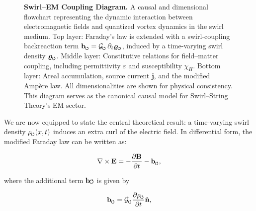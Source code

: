 \documentclass[12pt]{article}
\DeclareRobustCommand{\swirlarrow}{
\mathchoice{\mkern-2mu\scriptstyle\boldsymbol{\circlearrowleft}}%
{\mkern-2mu\scriptstyle\boldsymbol{\circlearrowleft}}%
{\mkern-2mu\scriptscriptstyle\boldsymbol{\circlearrowleft}}%
{\mkern-2mu\scriptscriptstyle\boldsymbol{\circlearrowleft}}
}%
\begin{document}
\begin{figure}[htbp]
{
        }
        \caption{\textbf{Swirl–EM Coupling Diagram.}
        A causal and dimensional flowchart representing the dynamic interaction between electromagnetic fields and quantized vortex dynamics in the swirl medium.
        Top layer: Faraday’s law is extended with a swirl-coupling backreaction term \( \mathbf{b}_{\swirlarrow} = \mathcal{G}_{\swirlarrow} \, \partial_t \bm{\varrho}_{\swirlarrow} \), induced by a time-varying swirl density \( \bm{\varrho}_{\swirlarrow} \).
        Middle layer: Constitutive relations for field–matter coupling, including permittivity \( \varepsilon \) and susceptibility \( \chi_H \).
        Bottom layer: Areal accumulation, source current \( \mathbf{j} \), and the modified Ampère law.
        All dimensionalities are shown for physical consistency. This diagram serves as the canonical causal model for Swirl–String Theory's EM sector.}
        \label{fig:swirl_em_causal}
    \end{figure}

We are now equipped to state the central theoretical result: a time-varying swirl density $\rho_{\swirlarrow}(x,t)$ induces an extra curl of the electric field. In differential form, the modified Faraday law can be written as:

\begin{equation}\label{eq:faraday-mod}

\nabla \times \mathbf{E} = -\frac{\partial \mathbf{B}}{\partial t} - \mathbf{b}_{\swirlarrow},
\end{equation}

where the additional term $\mathbf{b}{\swirlarrow}$ is given by

\begin{equation}\label{eq:b_swirl}

\mathbf{b}_{\swirlarrow} = \mathcal{G}_{\swirlarrow} \frac{\partial \rho_{\swirlarrow}}{\partial t} \hat{\mathbf{n}},
\end{equation}
\end{document}
